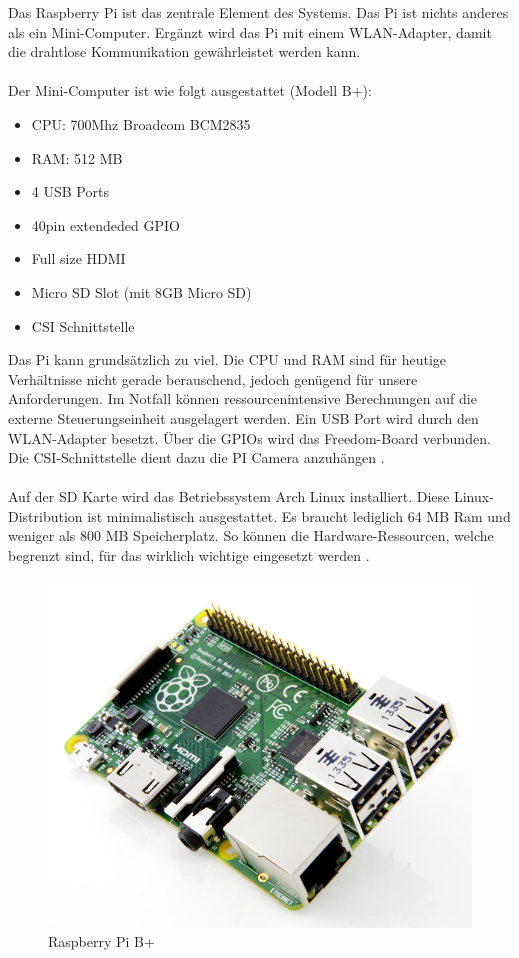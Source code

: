 Das Raspberry Pi ist das zentrale Element des Systems. Das Pi ist nichts anderes als ein Mini-Computer. Ergänzt wird das Pi mit einem WLAN-Adapter, damit die drahtlose Kommunikation gewährleistet werden kann. \\
\\
Der Mini-Computer ist wie folgt ausgestattet (Modell B+):
\begin{itemize}
	\item CPU: 700Mhz Broadcom BCM2835
	\item RAM: 512 MB
	\item 4 USB Ports
	\item 40pin extendeded GPIO
	\item Full size HDMI
	\item Micro SD Slot (mit 8GB Micro SD)
	\item CSI Schnittstelle
\end{itemize}

Das Pi kann grundsätzlich zu viel. Die CPU und RAM sind für heutige Verhältnisse nicht gerade berauschend, jedoch genügend für unsere Anforderungen. Im Notfall können ressourcenintensive Berechnungen auf die externe Steuerungseinheit ausgelagert werden. Ein USB Port wird durch den WLAN-Adapter besetzt. Über die GPIOs wird das Freedom-Board verbunden. Die CSI-Schnittstelle dient dazu die PI Camera anzuhängen \cite{raspberri-b-plus-spec}.\\
\\
Auf der SD Karte wird das Betriebssystem Arch Linux installiert. Diese Linux-Distribution ist minimalistisch ausgestattet. Es braucht lediglich 64 MB Ram und weniger als 800 MB Speicherplatz. So können die Hardware-Ressourcen, welche begrenzt sind, für das wirklich wichtige eingesetzt werden \cite{arch-linux-system-requirements}.

\begin{figure}[h!]
	\centering
	\includegraphics[width=0.3\linewidth]{../../fig/raspberry-pi-b-plus.jpg}
	\caption{Raspberry Pi B+}
	\label{fig:raspberry-pi-b-plus}
\end{figure}
